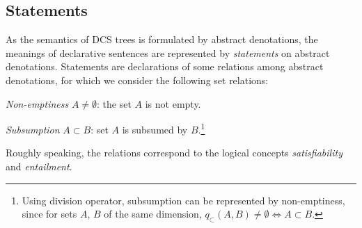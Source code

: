 \documentclass[11pt]{article}
\begin{document}
\subsection{Statements}
As the semantics of DCS trees is formulated by abstract denotations, 
the meanings of declarative sentences are represented by \emph{statements} 
on abstract denotations. Statements are declarations of some relations 
among abstract denotations, for which we consider the following set relations:

\vspace{4pt}
\noindent\textit{Non-emptiness} $A\ne\emptyset$: the set $A$ is not empty. 

\noindent\textit{Subsumption} $A\subset B$: set $A$ is subsumed by $B$.\footnote{Using 
division operator, subsumption can be represented by non-emptiness, since for sets $A$, $B$ 
of the same dimension, $q_{\subset}(A,B)\ne\emptyset\Leftrightarrow A\subset B$.} 
\vspace{4pt}

\noindent Roughly speaking, the relations correspond to
the logical concepts \emph{satisfiability} and \emph{entailment}.
\end{document}
